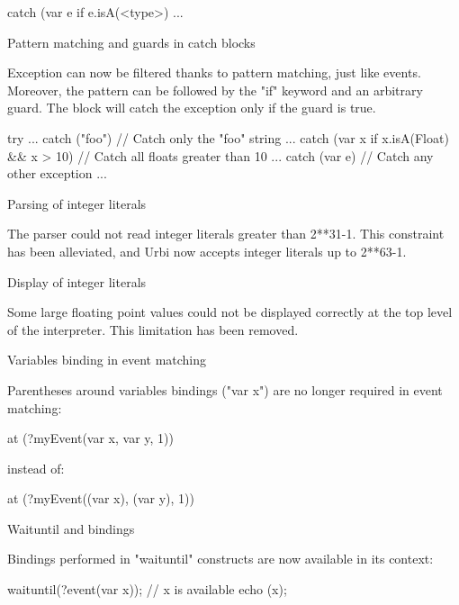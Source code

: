 \begin{description}
\begin{urbiunchecked}
catch (var e if e.isA(<type>)
{
  ...
}
\end{urbiunchecked}

\item Pattern matching and guards in catch blocks

  Exception can now be filtered thanks to pattern matching, just like
  events. Moreover, the pattern can be followed by the "if" keyword and an
  arbitrary guard. The block will catch the exception only if the guard is
  true.

\begin{urbiunchecked}
try
{ ... }
catch ("foo") // Catch only the "foo" string
{ ... }
catch (var x if x.isA(Float) && x > 10) // Catch all floats greater than 10
{ ... }
catch (var e)  // Catch any other exception
{ ... }
\end{urbiunchecked}

\item Parsing of integer literals

  The parser could not read integer literals greater than 2**31-1.  This
  constraint has been alleviated, and Urbi now accepts integer literals up
  to 2**63-1.

\item Display of integer literals

  Some large floating point values could not be displayed correctly at the
  top level of the interpreter. This limitation has been removed.

\item Variables binding in event matching

  Parentheses around variables bindings ("var x") are no longer required in
  event matching:

\begin{urbiunchecked}
at (?myEvent(var x, var y, 1))
\end{urbiunchecked}

\noindent
instead of:

\begin{urbiunchecked}
at (?myEvent((var x), (var y), 1))
\end{urbiunchecked}

\item Waituntil and bindings

  Bindings performed in "waituntil" constructs are now available in its
  context:

\begin{urbiunchecked}
waituntil(?event(var x));
// x is available
echo (x);
\end{urbiunchecked}


\end{description}
